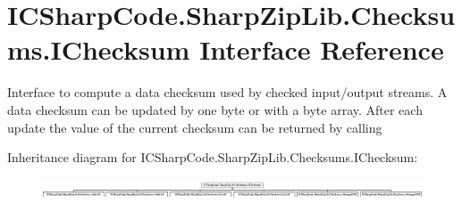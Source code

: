 \hypertarget{interface_i_c_sharp_code_1_1_sharp_zip_lib_1_1_checksums_1_1_i_checksum}{}\section{I\+C\+Sharp\+Code.\+Sharp\+Zip\+Lib.\+Checksums.\+I\+Checksum Interface Reference}
\label{interface_i_c_sharp_code_1_1_sharp_zip_lib_1_1_checksums_1_1_i_checksum}


Interface to compute a data checksum used by checked input/output streams. A data checksum can be updated by one byte or with a byte array. After each update the value of the current checksum can be returned by calling  


Inheritance diagram for I\+C\+Sharp\+Code.\+Sharp\+Zip\+Lib.\+Checksums.\+I\+Checksum\+:\begin{figure}[H]
\begin{center}
\leavevmode
\includegraphics[height=0.598291cm]{interface_i_c_sharp_code_1_1_sharp_zip_lib_1_1_checksums_1_1_i_checksum}
\end{center}
\end{figure}
